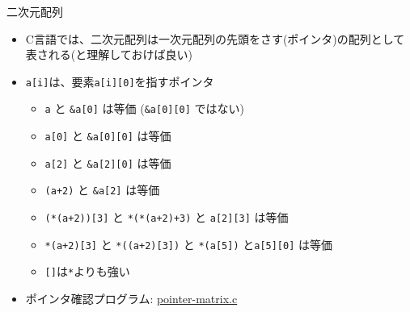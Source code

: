 \begin{frame}[t,fragile]{二次元配列}
  \begin{itemize}
    \setlength{\itemsep}{1em}
  \item C言語では、二次元配列は一次元配列の先頭をさす(ポインタ)の配列として表される(と理解しておけば良い)
  \item \verb+a[i]+は、要素\verb+a[i][0]+を指すポインタ
    \begin{itemize}
    \item \verb+a+ と \verb+&a[0]+ は等価 (\verb+&a[0][0]+ ではない)
    \item \verb+a[0]+ と \verb+&a[0][0]+ は等価
    \item \verb+a[2]+ と \verb+&a[2][0]+ は等価
    \item \verb^(a+2)^ と \verb^&a[2]^ は等価
    \item \verb^(*(a+2))[3]^ と \verb^*(*(a+2)+3)^ と \verb^a[2][3]^ は等価
    \item \verb^*(a+2)[3]^ と \verb^*((a+2)[3])^ と \verb^*(a[5])^ と\verb^a[5][0]^ は等価
    \item \verb^[]^は\verb^*^よりも強い
    \end{itemize}
  \item ポインタ確認プログラム: \href{https://github.com/todo-group/computer-experiments/blob/master/exercise/matrix/pointer-matrix.c}{pointer-matrix.c}
  \end{itemize}
\end{frame}
